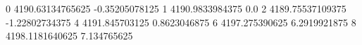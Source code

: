 0 4190.63134765625 -0.35205078125
1 4190.9833984375 0.0
2 4189.75537109375 -1.22802734375
4 4191.845703125 0.8623046875
6 4197.275390625 6.2919921875
8 4198.1181640625 7.134765625
